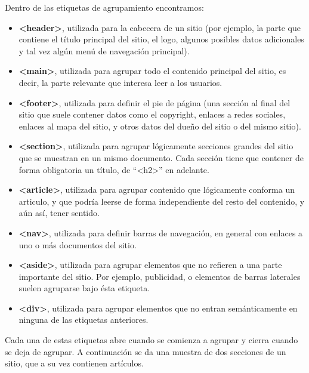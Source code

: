 Dentro de las etiquetas de agrupamiento encontramos:
\begin{itemize}
    \item \textbf{<header>}, utilizada para la cabecera de un sitio (por ejemplo,
        la parte que contiene el título principal del sitio, el logo, algunos posibles
        datos adicionales y tal vez algún menú de navegación principal).
    \item \textbf{<main>}, utilizada para agrupar todo el contenido principal del
        sitio, es decir, la parte relevante que interesa leer a los usuarios.
    \item \textbf{<footer>}, utilizada para definir el pie de página (una sección
        al final del sitio que suele contener datos como el copyright, enlaces
        a redes sociales, enlaces al mapa del sitio, y otros datos del dueño
        del sitio o del mismo sitio).
    \item \textbf{<section>}, utilizada para agrupar lógicamente secciones
        grandes del sitio que se muestran en un mismo documento. Cada sección
        tiene que contener de forma obligatoria un título, de ``<h2>'' en adelante.
    \item \textbf{<article>}, utilizada para agrupar contenido que lógicamente
        conforma un articulo, y que podría leerse de forma independiente del
        resto del contenido, y aún así, tener sentido.
    \item \textbf{<nav>}, utilizada para definir barras de navegación, en general
        con enlaces a uno o más documentos del sitio.
    \item \textbf{<aside>}, utilizada para agrupar elementos que no refieren a una
        parte importante del sitio. Por ejemplo, publicidad, o elementos de barras
        laterales suelen agruparse bajo ésta etiqueta.
    \item \textbf{<div>}, utilizada para agrupar elementos que no entran
        semánticamente en ninguna de las etiquetas anteriores.
\end{itemize}

Cada una de estas etiquetas abre cuando se comienza a agrupar y cierra cuando
se deja de agrupar. A continuación se da una muestra de dos secciones de un sitio,
que a su vez contienen artículos.

